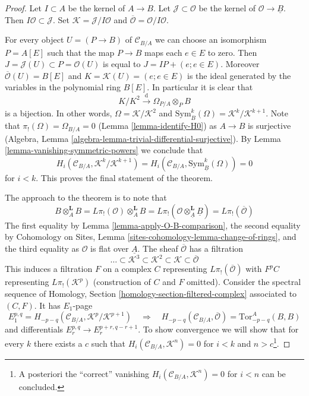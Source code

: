 \begin{proof}
Let $I \subset A$ be the kernel of $A \to B$. Let
$\mathcal{J} \subset \mathcal{O}$
be the kernel of $\mathcal{O} \to \underline{B}$. Then
$I\mathcal{O} \subset \mathcal{J}$. Set
$\mathcal{K} = \mathcal{J}/I\mathcal{O}$ and
$\overline{\mathcal{O}} = \mathcal{O}/I\mathcal{O}$.

\medskip\noindent
For every object $U = (P \to B)$ of $\mathcal{C}_{B/A}$
we can choose an isomorphism $P = A[E]$ such that the map
$P \to B$ maps each $e \in E$ to zero. Then
$J = \mathcal{J}(U) \subset P = \mathcal{O}(U)$
is equal to $J = IP + (e; e \in E)$. Moreover
$\overline{\mathcal{O}}(U) = B[E]$ and $K = \mathcal{K}(U) = (e; e \in E)$
is the ideal generated by the variables in the polynomial ring $B[E]$.
In particular it is clear that
$$
K/K^2 \xrightarrow{\text{d}} \Omega_{P/A} \otimes_P B
$$
is a bijection. In other words, $\Omega = \mathcal{K}/\mathcal{K}^2$
and $\text{Sym}_B^k(\Omega) = \mathcal{K}^k/\mathcal{K}^{k + 1}$.
Note that $\pi_!(\Omega) = \Omega_{B/A} = 0$ (Lemma \ref{lemma-identify-H0})
as $A \to B$ is surjective
(Algebra, Lemma \ref{algebra-lemma-trivial-differential-surjective}).
By Lemma \ref{lemma-vanishing-symmetric-powers} we conclude that
$$
H_i(\mathcal{C}_{B/A}, \mathcal{K}^k/\mathcal{K}^{k + 1}) =
H_i(\mathcal{C}_{B/A}, \text{Sym}^k_{\underline{B}}(\Omega)) = 0
$$
for $i < k$. This proves the final statement of the theorem.

\medskip\noindent
The approach to the theorem is to note that
$$
B \otimes_A^\mathbf{L} B = L\pi_!(\mathcal{O}) \otimes_A^\mathbf{L} B =
L\pi_!(\mathcal{O} \otimes_{\underline{A}}^\mathbf{L} \underline{B}) =
L\pi_!(\overline{\mathcal{O}})
$$
The first equality by Lemma \ref{lemma-apply-O-B-comparison},
the second equality by
Cohomology on Sites, Lemma \ref{sites-cohomology-lemma-change-of-rings}, and
the third equality as $\mathcal{O}$ is flat over $\underline{A}$.
The sheaf $\overline{\mathcal{O}}$ has a filtration
$$
\ldots \subset
\mathcal{K}^3 \subset
\mathcal{K}^2 \subset
\mathcal{K} \subset
\overline{\mathcal{O}}
$$
This induces a filtration $F$ on a complex $C$ representing
$L\pi_!(\overline{\mathcal{O}})$ with $F^pC$ representing
$L\pi_!(\mathcal{K}^p)$ (construction of $C$ and $F$ omitted).
Consider the spectral sequence of
Homology, Section \ref{homology-section-filtered-complex}
associated to $(C, F)$. It has $E_1$-page
$$
E_1^{p, q} = H_{- p - q}(\mathcal{C}_{B/A}, \mathcal{K}^p/\mathcal{K}^{p + 1})
\quad\Rightarrow\quad
H_{- p - q}(\mathcal{C}_{B/A}, \overline{\mathcal{O}}) = 
\text{Tor}_{- p - q}^A(B, B)
$$
and differentials $E_r^{p, q} \to E_r^{p + r, q - r + 1}$. To show convergence
we will show that for every $k$ there exists a $c$ such that
$H_i(\mathcal{C}_{B/A}, \mathcal{K}^n) = 0$
for $i < k$ and $n > c$\footnote{A posteriori
the ``correct'' vanishing $H_i(\mathcal{C}_{B/A}, \mathcal{K}^n) = 0$ for
$i < n$ can be concluded.}.


\end{proof}
